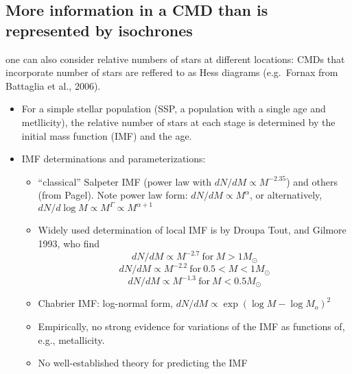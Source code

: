 \documentclass{article}
\begin{document}
\subsection{More information in a CMD than is represented by isochrones}
  one can also consider relative numbers of stars at
      different locations: CMDs that incorporate number of stars are
      reffered to as Hess diagrams (e.g.\ {Fornax}
      from Battaglia et al., 2006).
      \begin{itemize}
          \item For a simple stellar population (SSP, a population with
              a single age and metllicity), the relative number of stars
              at each stage is determined by the initial mass function (IMF)
              and the age.
          \item IMF determinations and parameterizations:
              \begin{itemize}
                  \item ``classical'' Salpeter IMF (power law with
                      $ dN/dM \propto M^{-2.35}$) and {others}
                      (from {Pagel}). Note power law form:
                      $ dN/dM \propto M^{\alpha}  $,
                      or alternatively,
                      $ dN/d\log{M} \propto M^{\Gamma} \propto M^{\alpha + 1} $
                  \item Widely used determination of local IMF is by
                      {Droupa Tout, and Gilmore 1993}, who find
                      $$ dN/dM \propto M^{-2.7}\ \textrm{for}\ M > 1M_{\odot} $$
                      $$ dN/dM \propto M^{-2.2}\ \textrm{for}\ 0.5 < M < 1M_{\odot} $$
                      $$ dN/dM \propto M^{-1.3}\ \textrm{for}\ M < 0.5M_{\odot} $$
                  \item Chabrier IMF: log-normal form,
                      $ dN/dM \propto \exp(\log{M}-\log{M_o})^2  $
                  \item Empirically, no strong evidence for variations of the
                    IMF as functions of, e.g., metallicity.
                  \item No well-established theory for predicting the IMF
              \end{itemize}
      \end{itemize}
\end{document}
